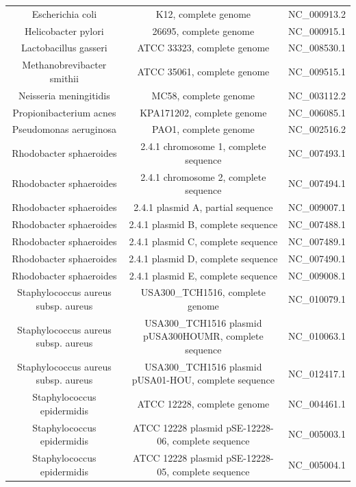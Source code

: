 \documentclass[10pt]{bmc_article}
\newenvironment{bmcformat}{\begin{raggedright}\baselineskip20pt\sloppy\setboolean{publ}{false}}{\end{raggedright}\baselineskip20pt\sloppy}
\begin{document}
\begin{bmcformat}
{\begin{tabular}{|c|c|c|}
        Escherichia coli & K12, complete genome &  NC\_000913.2 \\
        Helicobacter pylori & 26695, complete genome &     NC\_000915.1 \\ 
        Lactobacillus gasseri & ATCC 33323, complete genome &      NC\_008530.1 \\
        Methanobrevibacter smithii & ATCC 35061, complete genome &  NC\_009515.1 \\
        Neisseria meningitidis & MC58, complete genome &   NC\_003112.2 \\
        Propionibacterium acnes & KPA171202, complete genome &     NC\_006085.1 \\
        Pseudomonas aeruginosa &  PAO1, complete genome &   NC\_002516.2 \\
        Rhodobacter sphaeroides & 2.4.1 chromosome 1, complete sequence &  NC\_007493.1 \\
        Rhodobacter sphaeroides & 2.4.1 chromosome 2, complete sequence &  NC\_007494.1 \\
        Rhodobacter sphaeroides & 2.4.1 plasmid A, partial sequence &      NC\_009007.1 \\
        Rhodobacter sphaeroides & 2.4.1 plasmid B, complete sequence &     NC\_007488.1 \\
        Rhodobacter sphaeroides & 2.4.1 plasmid C, complete sequence &     NC\_007489.1 \\
        Rhodobacter sphaeroides & 2.4.1 plasmid D, complete sequence &     NC\_007490.1 \\
        Rhodobacter sphaeroides & 2.4.1 plasmid E, complete sequence &     NC\_009008.1 \\
        Staphylococcus aureus subsp. aureus & USA300\_TCH1516, complete genome &    NC\_010079.1 \\
        Staphylococcus aureus subsp. aureus & USA300\_TCH1516 plasmid pUSA300HOUMR, complete sequence &      NC\_010063.1 \\
        Staphylococcus aureus subsp. aureus & USA300\_TCH1516 plasmid pUSA01-HOU, complete sequence &       NC\_012417.1 \\
        Staphylococcus epidermidis & ATCC 12228, complete genome &  NC\_004461.1 \\
        Staphylococcus epidermidis & ATCC 12228 plasmid pSE-12228-06, complete sequence &   NC\_005003.1 \\
        Staphylococcus epidermidis & ATCC 12228 plasmid pSE-12228-05, complete sequence &   NC\_005004.1 \\

\end{tabular}}
\end{bmcformat}
\end{document}
